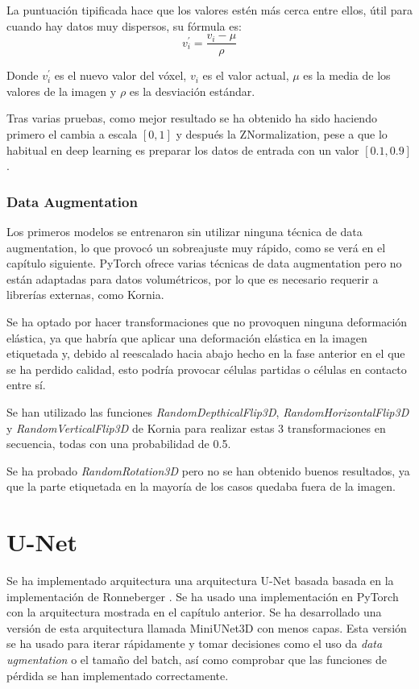 La puntuación tipificada hace que los valores estén más cerca entre ellos, útil para cuando hay datos muy dispersos, su fórmula es:
\begin{equation}
v_i^{'} = \frac{v_i - \mu}{\rho}
\end{equation}

Donde $v_i^{'}$ es el nuevo valor del vóxel, $v_i$ es el valor actual, $\mu$ es la media de los valores de la imagen y $\rho$ es la desviación estándar.

Tras varias pruebas, como mejor resultado se ha obtenido ha sido haciendo primero el cambia a escala $[0,1]$ y después la ZNormalization, pese a que lo habitual en deep learning es preparar los datos de entrada con un valor $[0.1,0.9]$.

\subsubsection{Data Augmentation}

Los primeros modelos se entrenaron sin utilizar ninguna técnica de data augmentation, lo que provocó un sobreajuste muy rápido, como se verá en el capítulo siguiente. PyTorch ofrece varias técnicas de data augmentation pero no están adaptadas para datos volumétricos, por lo que es necesario requerir a librerías externas, como Kornia.

Se ha optado por hacer transformaciones que no provoquen ninguna deformación elástica, ya que habría que aplicar una deformación elástica en la imagen etiquetada y, debido al reescalado hacia abajo hecho en la fase anterior en el que se ha perdido calidad, esto podría provocar células partidas o células en contacto entre sí.

Se han utilizado las funciones \textit{RandomDepthicalFlip3D}, \textit{RandomHorizontalFlip3D} y \textit{RandomVerticalFlip3D} de Kornia para realizar estas 3 transformaciones en secuencia, todas con una probabilidad de 0.5.

Se ha probado \textit{RandomRotation3D} pero no se han obtenido buenos resultados, ya que la parte etiquetada en la mayoría de los casos quedaba fuera de la imagen.

\section{U-Net}\label{sec:unet_implementation}

Se ha implementado arquitectura una arquitectura U-Net basada basada en la implementación de Ronneberger \cite{Ronneberger2015}. Se ha usado una implementación en PyTorch \cite{shiba242017} con la arquitectura mostrada en el capítulo anterior. Se ha desarrollado una versión de esta arquitectura llamada MiniUNet3D con menos capas. Esta versión se ha usado para iterar rápidamente y tomar decisiones como el uso da \textit{data ugmentation} o el tamaño del batch, así como comprobar que las funciones de pérdida se han implementado correctamente.

